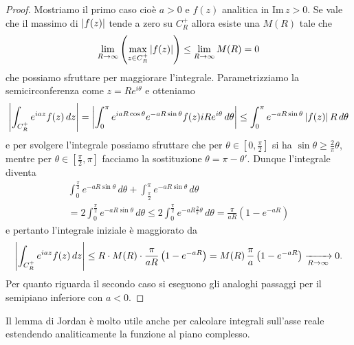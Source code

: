 \begin{proof}
  Mostriamo il primo caso cioè $ a > 0 $ e $ f(z) $ analitica in $ \text{Im}\,z > 0 $. Se vale che il massimo di $ \left|{f(z)}\right| $ tende a zero su 
  $ C^+_R $ allora esiste una $ M(R) $ tale che 
  \begin{align}
    \lim_{R\to \infty} \left( \max_{z \in C^+_R} \left|{f(z)}\right|\right) \leq \lim_{R\to \infty} M(R) = 0
  \end{align}
  che possiamo sfruttare per maggiorare l'integrale. Parametrizziamo la semicirconferenza come $ z = Re^{i\theta} $ e otteniamo
  \begin{align}
    \left|{\int_{C^+_R} e^{iaz} f(z) \,dz}\right| = \left|{\int_0^{\pi} e^{iaR\cos \theta} e^{-aR\sin\theta} f(z) i R e^{i\theta} \, d\theta}\right|
    \leq \int_0^{\pi} e^{-aR\sin\theta} \left|{f(z)}\right| R  \, d\theta
  \end{align}
  e per svolgere l'integrale possiamo sfruttare che per $ \theta \in [0, \frac\pi2] $ si ha $ \sin\theta \geq \frac2\pi \theta $, mentre per 
  $ \theta \in [\frac\pi2, \pi] $ facciamo la sostituzione $ \theta = \pi - \theta' $. Dunque l'integrale diventa
  \begin{gather}
    \int_0^{\frac\pi2} e^{-aR\sin\theta}\,d\theta + \int_{\frac\pi2}^{\pi} e^{-aR\sin\theta}\,d\theta 
    \\= 2 \int_0^{\frac\pi2} e^{-aR\sin\theta}\,d\theta \leq 2 \int_0^{\frac\pi2} e^{-aR \frac2\pi \theta}\,d\theta
    = \frac\pi{a R} \left( 1 - e^{-aR} \right)
  \end{gather}
  e pertanto l'integrale iniziale è maggiorato da 
  \begin{align}
    \left|{\int_{C^+_R} e^{iaz} f(z) \,dz}\right| \leq R \cdot M(R) \cdot \frac\pi{a R} \left( 1 - e^{-aR} \right) = M(R)\,\frac\pi{a} \left( 1 - e^{-aR} \right)
    \xrightarrow[R \to \infty]{} 0.
  \end{align}
  Per quanto riguarda il secondo caso si eseguono gli analoghi passaggi per il semipiano inferiore con $ a < 0 $.
\end{proof}

Il lemma di Jordan è molto utile anche per calcolare integrali sull'asse reale estendendo analiticamente la funzione al piano complesso.

